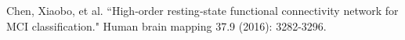 \documentclass[journal]{IEEEtran}
\begin{document}
\begin{thebibliography}{1}
	Chen, Xiaobo, et al. ``High‐order resting‐state functional connectivity network for MCI classification." Human brain mapping 37.9 (2016): 3282-3296.
		
%		
		
		
		
		
		
		
		
		
		
		
		
		
		
		
		
		
		
		
		

		
		
		
		
%		
		
		
		
		

\end{thebibliography}
\end{document}
